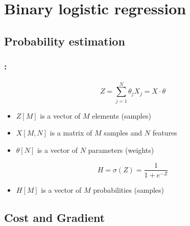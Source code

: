 \documentclass[xcolor=table]{beamer}
\begin{document}
\section{Binary logistic regression}

\begin{frame}
	\frametitle{\insertshortsubtitle}
	\framesubtitle{\insertsection}
	
	\begin{center}
	\end{center}
	
\end{frame}

\subsection{Probability estimation}

\begin{frame}
\frametitle{\insertshortsubtitle: \insertsection}
\framesubtitle{\insertsubsection}

\[Z = \sum_{j=1}^{N} \theta_j X_j = X \cdot \theta\]
\begin{itemize}
	\item $Z[M]$ is a vector of $M$ elements (samples)
	\item $X[M, N]$ is a matrix of $M$ samples and $N$ features
	\item $\theta[N]$ is a vector of $N$ parameters (weights)
\end{itemize}

\[H = \sigma(Z) = \frac{1}{1+e^{-Z}}\]

\begin{itemize}
	\item $H[M]$ is a vector of $M$ probabilities (samples)
\end{itemize}

\end{frame}

\subsection{Cost and Gradient}
\end{document}

